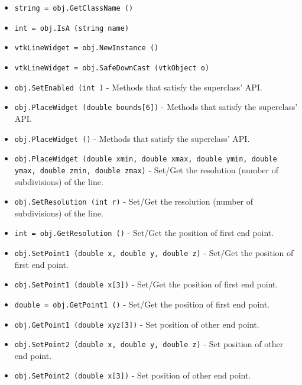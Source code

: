 \begin{itemize}
\item  \verb|string = obj.GetClassName ()|

\item  \verb|int = obj.IsA (string name)|

\item  \verb|vtkLineWidget = obj.NewInstance ()|

\item  \verb|vtkLineWidget = obj.SafeDownCast (vtkObject o)|

\item  \verb|obj.SetEnabled (int )| -  Methods that satisfy the superclass' API.

\item  \verb|obj.PlaceWidget (double bounds[6])| -  Methods that satisfy the superclass' API.

\item  \verb|obj.PlaceWidget ()| -  Methods that satisfy the superclass' API.

\item  \verb|obj.PlaceWidget (double xmin, double xmax, double ymin, double ymax, double zmin, double zmax)| -  Set/Get the resolution (number of subdivisions) of the line.

\item  \verb|obj.SetResolution (int r)| -  Set/Get the resolution (number of subdivisions) of the line.

\item  \verb|int = obj.GetResolution ()| -  Set/Get the position of first end point.

\item  \verb|obj.SetPoint1 (double x, double y, double z)| -  Set/Get the position of first end point.

\item  \verb|obj.SetPoint1 (double x[3])| -  Set/Get the position of first end point.

\item  \verb|double = obj.GetPoint1 ()| -  Set/Get the position of first end point.

\item  \verb|obj.GetPoint1 (double xyz[3])| -  Set position of other end point.

\item  \verb|obj.SetPoint2 (double x, double y, double z)| -  Set position of other end point.

\item  \verb|obj.SetPoint2 (double x[3])| -  Set position of other end point.


\end{itemize}
